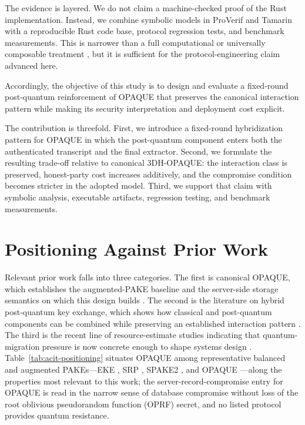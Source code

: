 \documentclass[conference]{IEEEtran}
\begin{document}
The evidence is layered. We do not claim a machine-checked proof of the Rust implementation. Instead, we combine symbolic models in ProVerif and Tamarin with a reproducible Rust code base, protocol regression tests, and benchmark measurements. This is narrower than a full computational or universally composable treatment \cite{canetti2001}, but it is sufficient for the protocol-engineering claim advanced here.

Accordingly, the objective of this study is to design and evaluate a fixed-round post-quantum reinforcement of OPAQUE that preserves the canonical interaction pattern while making its security interpretation and deployment cost explicit.

The contribution is threefold. First, we introduce a fixed-round hybridization pattern for OPAQUE in which the post-quantum component enters both the authenticated transcript and the final extractor. Second, we formulate the resulting trade-off relative to canonical 3DH-OPAQUE: the interaction class is preserved, honest-party cost increases additively, and the compromise condition becomes stricter in the adopted model. Third, we support that claim with symbolic analysis, executable artifacts, regression testing, and benchmark measurements.

\section{Positioning Against Prior Work}

Relevant prior work falls into three categories. The first is canonical OPAQUE, which establishes the augmented-PAKE baseline and the server-side storage semantics on which this design builds \cite{jarecki2018,ietf-opaque}. The second is the literature on hybrid post-quantum key exchange, which shows how classical and post-quantum components can be combined while preserving an established interaction pattern \cite{tlshybrid2025}. The third is the recent line of resource-estimate studies indicating that quantum-migration pressure is now concrete enough to shape systems design \cite{babbush2026}. Table~\ref{tab:acit-positioning} situates OPAQUE among representative balanced and augmented PAKEs---EKE \cite{bellovin1992}, SRP \cite{wu1998}, SPAKE2 \cite{ladd2023}, and OPAQUE \cite{jarecki2018}---along the properties most relevant to this work; the server-record-compromise entry for OPAQUE is read in the narrow sense of database compromise without loss of the root oblivious pseudorandom function (OPRF) secret, and no listed protocol provides quantum resistance.
\end{document}
